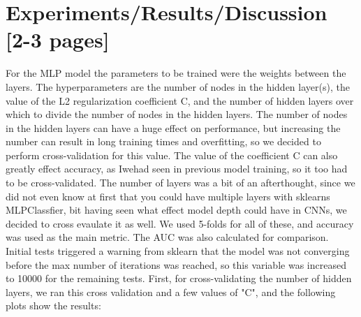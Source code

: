 \documentclass[12pt, a4]{article} %
\begin{document}
\section{Experiments/Results/Discussion [2-3 pages]}
For the MLP model the parameters to be trained were the weights between the layers.  The hyperparameters are the number of nodes in the hidden layer(s), the value of the L2 regularization coefficient C, and the number of hidden layers over which to divide the number of nodes in the hidden layers.  The number of nodes in the hidden layers can have a huge effect on performance, but increasing the number can result in long training times and overfitting, so we decided to perform cross-validation for this value.  The value of the coefficient C can also greatly effect accuracy, as Iwehad seen in previous model training, so it too had to be cross-validated.  The number of layers was a bit of an afterthought, since we did not even know at first that you could have multiple layers with sklearns MLPClassfier, bit having seen what effect model depth could have in CNNs, we decided to cross evaulate it as well.  We used 5-folds for all of these, and accuracy was used as the main metric. The AUC was also calculated for comparison.  Initial tests triggered a warning from sklearn that the model was not converging before the max number of iterations was reached, so this variable was increased to 10000 for the remaining tests.  First, for cross-validating the number of hidden layers, we ran this cross validation and a few values of "C", and the following plots show the results: 
\end{document}
